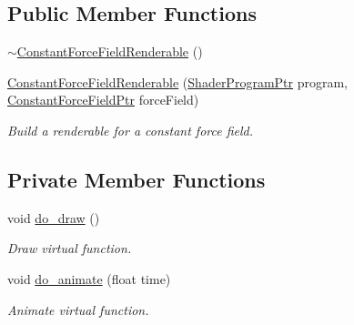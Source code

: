 \subsection*{Public Member Functions}
\begin{DoxyCompactItemize}
\item 
\hyperlink{classConstantForceFieldRenderable_a5b3b26ab2ddb497413df242773f941a2}{$\sim$\+Constant\+Force\+Field\+Renderable} ()
\item 
\hyperlink{classConstantForceFieldRenderable_a47f65f935336c605e55d94efb84e6842}{Constant\+Force\+Field\+Renderable} (\hyperlink{ShaderProgram_8hpp_af8e4af1ad4c53875ee5d32ab7e1f4966}{Shader\+Program\+Ptr} program, \hyperlink{ConstantForceField_8hpp_a7b80b566be4aeb0b5474a8aeb2e0ff49}{Constant\+Force\+Field\+Ptr} force\+Field)
\begin{DoxyCompactList}\small\item\em Build a renderable for a constant force field. \end{DoxyCompactList}\end{DoxyCompactItemize}
\subsection*{Private Member Functions}
\begin{DoxyCompactItemize}
\item 
void \hyperlink{classConstantForceFieldRenderable_af9ee973e392967a5da31b0b9b67d3fdd}{do\+\_\+draw} ()
\begin{DoxyCompactList}\small\item\em Draw virtual function. \end{DoxyCompactList}\item 
void \hyperlink{classConstantForceFieldRenderable_aa2c53dcf6411244d5a5e4ed562f9574c}{do\+\_\+animate} (float time)
\begin{DoxyCompactList}\small\item\em Animate virtual function. \end{DoxyCompactList}\end{DoxyCompactItemize}
